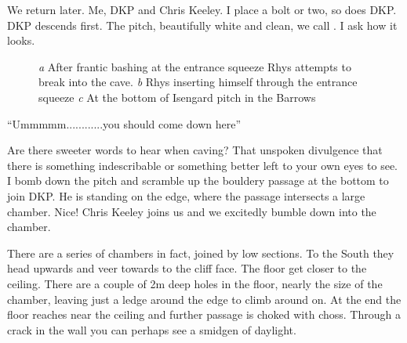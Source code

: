 We return later. Me, DKP and Chris Keeley. I place a bolt or two, so does DKP. DKP descends first. The pitch, beautifully white and clean, we call . I ask how it looks. 

\begin{figure}[t!]
\checkoddpage \ifoddpage \forcerectofloat \else \forceversofloat \fi
\centering
\begin{subfigure}[t]{0.42\textwidth}
\centering
{}
 \caption{}\label{water chamber below helm's deep}
\end{subfigure}
    \hfill
    \begin{subfigure}[t]{0.56\textwidth}
        \centering
        \caption{} \label{HelmsDeep}
    \end{subfigure}
    
    \vspace{0.3cm}
    \begin{subfigure}[t]{\textwidth}
    \centering
        \caption{} \label{Touching the Void}
    \end{subfigure}
    \caption{
    \emph{a} After frantic bashing at the entrance squeeze Rhys attempts to break into the cave.
    \emph{b} Rhys inserting himself through the entrance squeeze
    \emph{c} At the bottom of Isengard pitch in the Barrows}
\end{figure}





“Ummmmm............you should come down here”
 
Are there sweeter words to hear when caving? That unspoken divulgence that there is something indescribable or something better left to your own eyes to see. I bomb down the pitch and scramble up the bouldery passage at the bottom to join DKP. He is standing on the edge, where the passage intersects  a large chamber. Nice! Chris Keeley joins us and we excitedly bumble down into the chamber.
 
There are a series of chambers in fact, joined by low sections. To the South they head upwards and veer towards to the cliff face. The floor get closer to the ceiling. There are a couple of 2m deep holes in the floor, nearly the size of the chamber, leaving just a ledge around the edge to climb around on. At the end the floor reaches near the ceiling and further passage is choked with choss. Through a crack in the wall you can perhaps see a smidgen of daylight.
 
